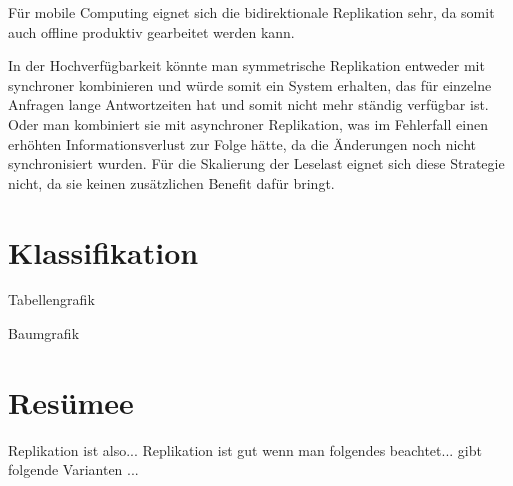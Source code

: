Für mobile Computing eignet sich die bidirektionale Replikation sehr, da somit auch offline produktiv gearbeitet werden kann.

In der Hochverfügbarkeit könnte man symmetrische Replikation entweder mit synchroner kombinieren und würde somit ein System erhalten, das für einzelne Anfragen lange Antwortzeiten hat und somit nicht mehr ständig verfügbar ist. Oder man kombiniert sie mit asynchroner Replikation, was im Fehlerfall einen erhöhten Informationsverlust zur Folge hätte, da die Änderungen noch nicht synchronisiert wurden. Für die Skalierung der Leselast eignet sich diese Strategie nicht, da sie keinen zusätzlichen Benefit dafür bringt.

\section{Klassifikation}

Tabellengrafik

Baumgrafik

\section{Resümee}
Replikation ist also...
Replikation ist gut wenn man folgendes beachtet...
gibt folgende Varianten ...